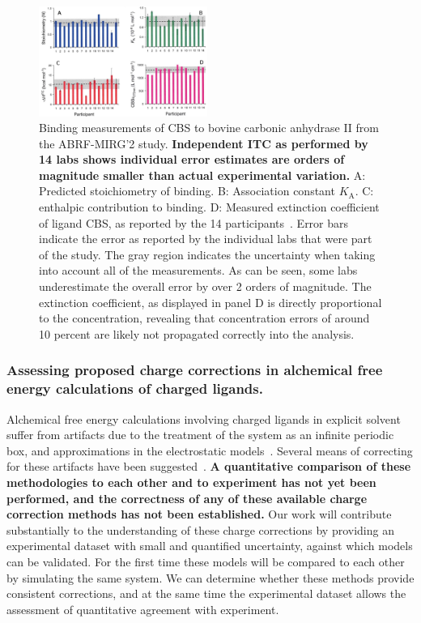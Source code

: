 \documentclass[10pt,final]{article}
\begin{document}
\begin{figure}[H]
	\centering
	\includegraphics[width=0.49\textwidth]{figures/cbs_ca_II.PNG}
	\caption{Binding measurements of CBS to bovine carbonic anhydrase II from the ABRF-MIRG'2 study. \textbf{Independent ITC as performed by 14 labs shows individual error estimates are orders of magnitude smaller than actual experimental variation.} A: Predicted stoichiometry of binding. B: Association constant $K_\mathrm{A}$. C: enthalpic contribution to binding. D: Measured extinction coefficient of ligand CBS, as reported by the 14 participants~\autocite{Myszka2003a}. Error bars indicate the error as reported by the individual labs that were part of the study. The gray region indicates the uncertainty when taking into account all of the measurements. As can be seen, some labs underestimate the overall error by over 2 orders of magnitude. The extinction coefficient, as displayed in panel D is directly proportional to the concentration, revealing that concentration errors of around 10 percent are likely not propagated correctly into the analysis.}
	\label{figure:abrf-mirg2}	
\end{figure}

\subsubsection*{Assessing proposed charge corrections in alchemical free energy calculations of charged ligands.}
Alchemical free energy calculations involving charged ligands in explicit solvent suffer from artifacts due to the treatment of the system as an infinite periodic box, and approximations in the electrostatic models~\autocite{Rocklin2013b,Muddana2014a}. 
%
Several means of correcting for these artifacts have been suggested~\autocite{Reif2013a,Rocklin2013a,Lin2014a}.
%
\textbf{A quantitative comparison of these methodologies to each other and to experiment has not yet been performed, and the correctness of any of these available charge correction methods has not been established.}
%
Our work will contribute substantially to the understanding of these charge corrections by providing an experimental dataset with small and quantified uncertainty, against which models can be validated.
%
For the first time these models will be compared to each other by simulating the same system.
%
We can determine whether these methods provide consistent corrections, and at the same time the experimental dataset allows the assessment of quantitative agreement with experiment.
\end{document}
